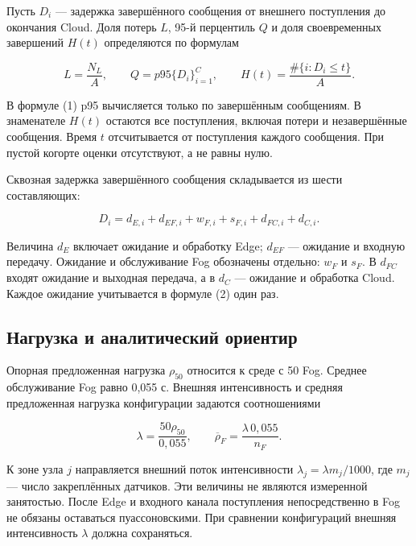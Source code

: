Пусть \(D_i\) --- задержка завершённого сообщения от внешнего поступления до окончания Cloud. Доля потерь \(L\), 95-й перцентиль \(Q\) и доля своевременных завершений \(H(t)\) определяются по формулам

\begin{equation}\label{eq:1}
L=\frac{N_L}{A},\qquad Q=p95\{D_i\}_{i=1}^{C},\qquad
H(t)=\frac{\#\{i:D_i\leq t\}}{A}.
\end{equation}

В формуле (1) p95 вычисляется только по завершённым сообщениям. В знаменателе \(H(t)\) остаются все поступления, включая потери и незавершённые сообщения. Время \(t\) отсчитывается от поступления каждого сообщения. При пустой когорте оценки отсутствуют, а не равны нулю.

Сквозная задержка завершённого сообщения складывается из шести составляющих:

\begin{equation}\label{eq:2}
D_i=d_{E,i}+d_{EF,i}+w_{F,i}+s_{F,i}+d_{FC,i}+d_{C,i}.
\end{equation}

Величина \(d_E\) включает ожидание и обработку Edge; \(d_{EF}\) --- ожидание и входную передачу. Ожидание и обслуживание Fog обозначены отдельно: \(w_F\) и \(s_F\). В \(d_{FC}\) входят ожидание и выходная передача, а в \(d_C\) --- ожидание и обработка Cloud. Каждое ожидание учитывается в формуле (2) один раз.

\hypertarget{ux43dux430ux433ux440ux443ux437ux43aux430-ux438-ux430ux43dux430ux43bux438ux442ux438ux447ux435ux441ux43aux438ux439-ux43eux440ux438ux435ux43dux442ux438ux440}{%
\subsection{Нагрузка и аналитический ориентир}}

Опорная предложенная нагрузка \(\rho_{50}\) относится к среде с 50 Fog. Среднее обслуживание Fog равно 0,055 с. Внешняя интенсивность и средняя предложенная нагрузка конфигурации задаются соотношениями

\begin{equation}\label{eq:3}
\lambda=\frac{50\rho_{50}}{0{,}055},\qquad
\overline{\rho}_F=\frac{\lambda\,0{,}055}{n_F}.
\end{equation}

К зоне узла \(j\) направляется внешний поток интенсивности \(\lambda_j=\lambda m_j/1000\), где \(m_j\) --- число закреплённых датчиков. Эти величины не являются измеренной занятостью. После Edge и входного канала поступления непосредственно в Fog не обязаны оставаться пуассоновскими. При сравнении конфигураций внешняя интенсивность \(\lambda\) должна сохраняться.

